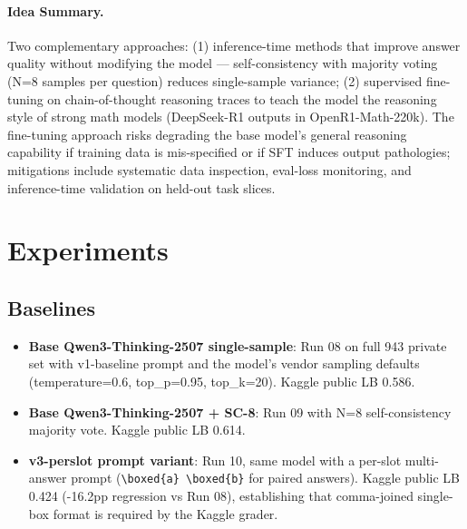 \documentclass{article}
\begin{document}
\paragraph{Idea Summary.}
Two complementary approaches: (1) inference-time methods that improve answer quality without modifying the model --- self-consistency with majority voting~\citep{wang2023sc} (N=8 samples per question) reduces single-sample variance; (2) supervised fine-tuning on chain-of-thought reasoning traces to teach the model the reasoning style of strong math models (DeepSeek-R1 outputs in OpenR1-Math-220k). The fine-tuning approach risks degrading the base model's general reasoning capability if training data is mis-specified or if SFT induces output pathologies; mitigations include systematic data inspection, eval-loss monitoring, and inference-time validation on held-out task slices.

\section{Experiments}
\label{sec:experiments}

\subsection{Baselines}
\label{sec:baselines}

\begin{itemize}
    \item \textbf{Base Qwen3-Thinking-2507 single-sample}: Run 08 on full 943 private set with v1-baseline prompt and the model's vendor sampling defaults (temperature=0.6, top\_p=0.95, top\_k=20). Kaggle public LB 0.586.
    \item \textbf{Base Qwen3-Thinking-2507 + SC-8}: Run 09 with N=8 self-consistency majority vote. Kaggle public LB 0.614.
    \item \textbf{v3-perslot prompt variant}: Run 10, same model with a per-slot multi-answer prompt (\texttt{\textbackslash boxed\{a\} \textbackslash boxed\{b\}} for paired answers). Kaggle public LB 0.424 (-16.2pp regression vs Run 08), establishing that comma-joined single-box format is required by the Kaggle grader.
\end{itemize}
\end{document}
